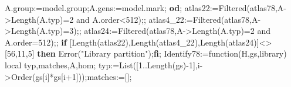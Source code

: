 \documentclass[
  10pt,
  letterpaper,
]{article}
\newenvironment{Shaded}{}{}
\newcommand{\BuiltInTok}[1]{\textcolor[rgb]{0.00,0.50,0.00}{#1}}
\newcommand{\ConstantTok}[1]{\textcolor[rgb]{0.53,0.00,0.00}{#1}}
\newcommand{\ControlFlowTok}[1]{\textcolor[rgb]{0.00,0.44,0.13}{\textbf{#1}}}
\newcommand{\ExtensionTok}[1]{#1}
\newcommand{\FloatTok}[1]{\textcolor[rgb]{0.25,0.63,0.44}{#1}}
\newcommand{\FunctionTok}[1]{\textcolor[rgb]{0.02,0.16,0.49}{#1}}
\newcommand{\NormalTok}[1]{#1}
\newcommand{\OperatorTok}[1]{\textcolor[rgb]{0.40,0.40,0.40}{#1}}
\newcommand{\StringTok}[1]{\textcolor[rgb]{0.25,0.44,0.63}{#1}}
\newcommand{\VariableTok}[1]{\textcolor[rgb]{0.10,0.09,0.49}{#1}}
\begin{document}
\begin{Shaded}
\begin{Highlighting}[]
 \VariableTok{A}\NormalTok{.}\VariableTok{group}\OperatorTok{:=}\VariableTok{model}\NormalTok{.}\VariableTok{group}\OperatorTok{;}\VariableTok{A}\NormalTok{.}\VariableTok{gens}\OperatorTok{:=}\VariableTok{model}\NormalTok{.}\VariableTok{mark}\OperatorTok{;}
\ControlFlowTok{od}\OperatorTok{;}
\VariableTok{atlas22}\OperatorTok{:=}\BuiltInTok{Filtered}\NormalTok{(}\VariableTok{atlas78}\OperatorTok{,}\VariableTok{A}\OperatorTok{{-}\textgreater{}}\BuiltInTok{Length}\NormalTok{(}\VariableTok{A}\NormalTok{.}\VariableTok{typ}\NormalTok{)}\OperatorTok{=}\FloatTok{2} \ConstantTok{and} \VariableTok{A}\NormalTok{.}\VariableTok{order}\OperatorTok{\textless{}}\FloatTok{512}\NormalTok{)}\OperatorTok{;;}
\VariableTok{atlas4\_22}\OperatorTok{:=}\BuiltInTok{Filtered}\NormalTok{(}\VariableTok{atlas78}\OperatorTok{,}\VariableTok{A}\OperatorTok{{-}\textgreater{}}\BuiltInTok{Length}\NormalTok{(}\VariableTok{A}\NormalTok{.}\VariableTok{typ}\NormalTok{)}\OperatorTok{=}\FloatTok{3}\NormalTok{)}\OperatorTok{;;}
\VariableTok{atlas24}\OperatorTok{:=}\BuiltInTok{Filtered}\NormalTok{(}\VariableTok{atlas78}\OperatorTok{,}\VariableTok{A}\OperatorTok{{-}\textgreater{}}\BuiltInTok{Length}\NormalTok{(}\VariableTok{A}\NormalTok{.}\VariableTok{typ}\NormalTok{)}\OperatorTok{=}\FloatTok{2} \ConstantTok{and} \VariableTok{A}\NormalTok{.}\VariableTok{order}\OperatorTok{=}\FloatTok{512}\NormalTok{)}\OperatorTok{;;}
\ControlFlowTok{if}\NormalTok{ [}\BuiltInTok{Length}\NormalTok{(}\VariableTok{atlas22}\NormalTok{)}\OperatorTok{,}\BuiltInTok{Length}\NormalTok{(}\VariableTok{atlas4\_22}\NormalTok{)}\OperatorTok{,}\BuiltInTok{Length}\NormalTok{(}\VariableTok{atlas24}\NormalTok{)]}\OperatorTok{\textless{}\textgreater{}}\NormalTok{[}\FloatTok{56}\OperatorTok{,}\FloatTok{11}\OperatorTok{,}\FloatTok{5}\NormalTok{] }\ControlFlowTok{then} \BuiltInTok{Error}\NormalTok{(}\StringTok{"Library partition"}\NormalTok{)}\OperatorTok{;}\ControlFlowTok{fi}\OperatorTok{;}
\VariableTok{Identify78}\OperatorTok{:=}\FunctionTok{function}\NormalTok{(}\VariableTok{H}\OperatorTok{,}\VariableTok{gs}\OperatorTok{,}\VariableTok{library}\NormalTok{)}
 \ExtensionTok{local} \VariableTok{typ}\OperatorTok{,}\VariableTok{matches}\OperatorTok{,}\VariableTok{A}\OperatorTok{,}\VariableTok{hom}\OperatorTok{;}
 \VariableTok{typ}\OperatorTok{:=}\BuiltInTok{List}\NormalTok{([}\FloatTok{1}\OperatorTok{..}\BuiltInTok{Length}\NormalTok{(}\VariableTok{gs}\NormalTok{)}\OperatorTok{{-}}\FloatTok{1}\NormalTok{]}\OperatorTok{,}\VariableTok{i}\OperatorTok{{-}\textgreater{}}\BuiltInTok{Order}\NormalTok{(}\VariableTok{gs}\NormalTok{[}\VariableTok{i}\NormalTok{]}\OperatorTok{*}\VariableTok{gs}\NormalTok{[}\VariableTok{i}\OperatorTok{+}\FloatTok{1}\NormalTok{]))}\OperatorTok{;}\VariableTok{matches}\OperatorTok{:=}\NormalTok{[]}\OperatorTok{;}

\end{Highlighting}
\end{Shaded}
\end{document}
